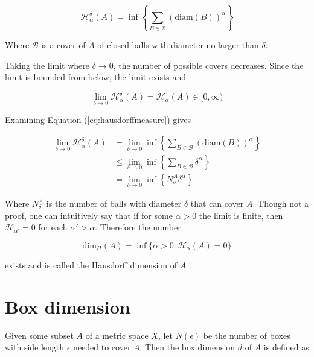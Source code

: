 \begin{equation}
    \mathcal{H}^{\delta}_\alpha (A) = \inf \left \{ \sum_{B \in \mathcal{B}} \left ( \text{diam}(B) \right)^\alpha \right \}
\end{equation}

Where $\mathcal{B}$ is a cover of $A$ of closed balls with diameter no larger than $\delta$.

Taking the limit where $\delta \to 0$, the number of possible covers decreases. Since the limit is bounded from below, the limit exists \cite{Rudin:PrincMathAnalysis} and

\begin{equation}
    \lim_{\delta \to 0} \mathcal{H}^{\delta}_{\alpha} (A) = \mathcal{H}_\alpha (A) \in [0, \infty )
\label{eq:hausdorffmeasure}
\end{equation}

Examining Equation (\ref{eq:hausdorffmeasure}) gives

\begin{align}
    \lim_{\delta \to 0} \mathcal{H}^{\delta}_{\alpha} (A) &= \lim_{\delta \to 0} \inf \left \{ \sum_{B \in \mathcal{B}} \left ( \text{diam}(B) \right)^\alpha \right \} \\
%
    &\leq \lim_{\delta \to 0} \inf \left \{ \sum_{B \in \mathcal{B}} \delta^\alpha \right \} \\
%
    &= \lim_{\delta \to 0} \inf \left \{ N_{\delta}^A \delta^\alpha \right \}
\end{align}

Where $N_{\delta}^A$ is the number of balls with diameter $\delta$ that can cover $A$. Though not a proof, one can intuitively say that if for some $\alpha > 0$ the limit is finite, then $\mathcal{H}_{\alpha'} = 0$ for each $\alpha' > \alpha$. Therefore the number

\begin{equation}
    \text{dim}_H (A) = \inf \{ \alpha > 0 : \mathcal{H}_\alpha (A) = 0 \}
\end{equation}

exists and is called the Hausdorff dimension of $A$ \cite{Heinonen:HausdorffDimMath}.


\section{Box dimension}
\label{sec:boxdimension}

Given some subset $A$ of a metric space $X$, let $N(\epsilon)$ be the number of boxes with side length $\epsilon$ needed to cover $A$. Then the box dimension $d$ of $A$ is defined as \cite{strogatz:dynamics_chaos}

